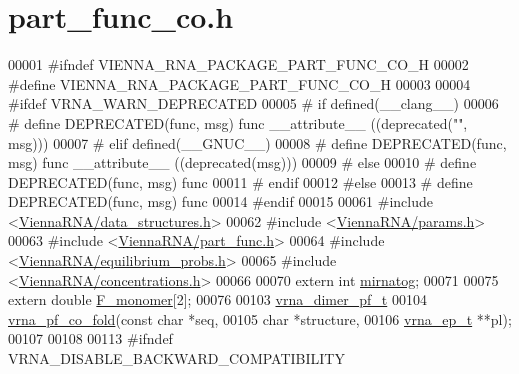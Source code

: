 \hypertarget{part__func__co_8h_source}{}\section{part\+\_\+func\+\_\+co.\+h}
\label{part__func__co_8h_source}

\begin{DoxyCode}
00001 \textcolor{preprocessor}{#ifndef VIENNA\_RNA\_PACKAGE\_PART\_FUNC\_CO\_H}
00002 \textcolor{preprocessor}{#define VIENNA\_RNA\_PACKAGE\_PART\_FUNC\_CO\_H}
00003 
00004 \textcolor{preprocessor}{#ifdef VRNA\_WARN\_DEPRECATED}
00005 \textcolor{preprocessor}{# if defined(\_\_clang\_\_)}
00006 \textcolor{preprocessor}{#  define DEPRECATED(func, msg) func \_\_attribute\_\_ ((deprecated("", msg)))}
00007 \textcolor{preprocessor}{# elif defined(\_\_GNUC\_\_)}
00008 \textcolor{preprocessor}{#  define DEPRECATED(func, msg) func \_\_attribute\_\_ ((deprecated(msg)))}
00009 \textcolor{preprocessor}{# else}
00010 \textcolor{preprocessor}{#  define DEPRECATED(func, msg) func}
00011 \textcolor{preprocessor}{# endif}
00012 \textcolor{preprocessor}{#else}
00013 \textcolor{preprocessor}{# define DEPRECATED(func, msg) func}
00014 \textcolor{preprocessor}{#endif}
00015 
00061 \textcolor{preprocessor}{#include <\hyperlink{data__structures_8h}{ViennaRNA/data\_structures.h}>}
00062 \textcolor{preprocessor}{#include <\hyperlink{params_8h}{ViennaRNA/params.h}>}
00063 \textcolor{preprocessor}{#include <\hyperlink{part__func_8h}{ViennaRNA/part\_func.h}>}
00064 \textcolor{preprocessor}{#include <\hyperlink{equilibrium__probs_8h}{ViennaRNA/equilibrium\_probs.h}>}
00065 \textcolor{preprocessor}{#include <\hyperlink{concentrations_8h}{ViennaRNA/concentrations.h}>}
00066 
00070 \textcolor{keyword}{extern} \textcolor{keywordtype}{int}    \hyperlink{group__pf__cofold_gaff27888c4088cc1f60fd59cbd589474c}{mirnatog};
00071 
00075 \textcolor{keyword}{extern} \textcolor{keywordtype}{double} \hyperlink{group__pf__cofold_gac2d1851a710a8561390861155ca988fe}{F\_monomer}[2];
00076 
00103 \hyperlink{group__pf__cofold_structvrna__dimer__pf__s}{vrna\_dimer\_pf\_t}
00104 \hyperlink{group__pf__cofold_gaf2b846f7ac382686f35ff7b9202fdd5c}{vrna\_pf\_co\_fold}(\textcolor{keyword}{const} \textcolor{keywordtype}{char}  *seq,
00105                 \textcolor{keywordtype}{char}        *structure,
00106                 \hyperlink{group__struct__utils_structvrna__elem__prob__s}{vrna\_ep\_t}   **pl);
00107 
00108 
00113 \textcolor{preprocessor}{#ifndef VRNA\_DISABLE\_BACKWARD\_COMPATIBILITY}

\end{DoxyCode}
